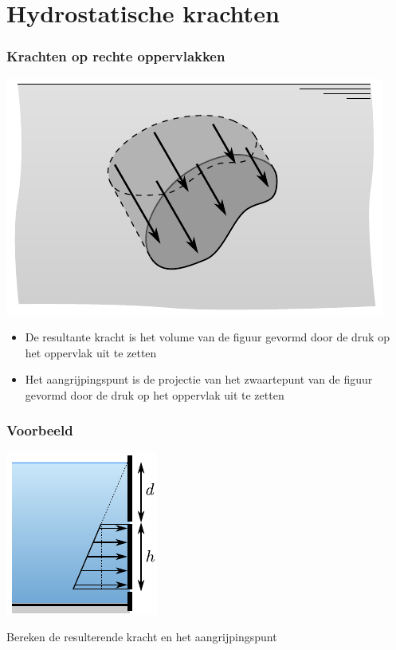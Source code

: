 \documentclass[t]{beamer}
\begin{document}
  	\section{Hydrostatische krachten}		
		\begin{frame}
			\frametitle{Krachten op rechte oppervlakken}
			\center
			\includegraphics[scale=0.9]{../fig/hydrostatica/grafische_weergave_integraal}
			\begin{itemize}
				\item<2-> De resultante kracht is het volume van de figuur gevormd door de druk op het oppervlak uit te zetten
				\item<3-> Het aangrijpingspunt is de projectie van het zwaartepunt van de figuur gevormd door de druk op het oppervlak uit te zetten
			\end{itemize}
  		\end{frame}
  		\begin{frame}
			\frametitle{Voorbeeld}
			\vspace{1cm}
			\center
			\includegraphics{../fig/hydrostatica/kracht_op_luik}
			
			Bereken de resulterende kracht en het aangrijpingspunt
		\end{frame}
\end{document}
